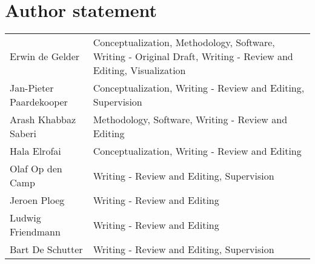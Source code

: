 \documentclass[10pt,final,a4paper,oneside,onecolumn]{article}
\begin{document}
	
\section*{Author statement}

\begin{tabularx}{\linewidth}{lX}
	Erwin de Gelder & Conceptualization, Methodology, Software, Writing - Original Draft, Writing - Review and Editing, Visualization \\
	Jan-Pieter Paardekooper & Conceptualization, Writing - Review and Editing, Supervision \\
	Arash Khabbaz Saberi & Methodology, Software, Writing - Review and Editing\\
	Hala Elrofai & Conceptualization, Writing - Review and Editing\\
	Olaf Op den Camp & Writing - Review and Editing, Supervision\\
	Jeroen Ploeg & Writing - Review and Editing\\
	Ludwig Friendmann & Writing - Review and Editing\\
	Bart De Schutter & Writing - Review and Editing, Supervision
\end{tabularx}
\end{document}
